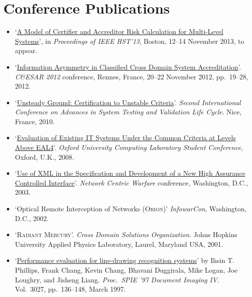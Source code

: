 \documentclass[12pt,letterpaper]{article}
\begin{document}
\vspace{-8mm}
\section*{Conference Publications}

\begin{itemize}
	\item `\href{http://ieee-hst.org/agenda/papers/papers_sched.html#cyber4}{A Model of
		Certifier and Accreditor Risk Calculation for Multi-Level Systems}', in
		\emph{Proceedings of IEEE HST'13}, Boston, 12--14 November 2013, to appear.

	\item `\href{http://applied-math.org/CESAR2012_information_asymmetry.pdf}{Information
		Asymmetry in Classified Cross Domain System Accreditation}'. \emph{C\&ESAR 2012}
		conference, Rennes, France, 20--22 November 2012, pp.\ 19--28, 2012.

	\item `\href{http://ieeexplore.ieee.org/xpls/abs_all.jsp?arnumber=5617171&tag=1}{Unsteady
		Ground: Certification to Unstable Criteria}'. \emph{Second International Conference
		on Advances in System Testing and Validation Life Cycle}. Nice, France, 2010. 

	\item `\href{http://www.cs.ox.ac.uk/files/1328/RR-08-10.pdf}{Evaluation of Existing IT
		Systems Under the Common Criteria at Levels Above EAL4}'. \emph{Oxford University
		Computing Laboratory Student Conference}, Oxford, U.K., 2008.

    \item `\href{https://docs.google.com/viewer?a=v&q=cache:OjDo4H9Pj10J:citeseerx.ist.psu.edu/viewdoc/download%3Fdoi%3D10.1.1.10.4531%26rep%3Drep1%26type%3Dpdf+&hl=en&gl=uk&pid=bl&srcid=ADGEESgzzne2bVzWsUDU4ITF7lKKcGhA_k51PqkEVB7aiZgGgJ65C9VGGFIDIL2TQ_YUcdDO20UNkw-mnwZN71u0JDy5EYltrpjR_If5ZU8yyXc400Izs9ywtAeLkxHyxd02fNek-mj4&sig=AHIEtbQHRLT1rO3Eft0-P1LmHBrZ7zJL7w}{Use
		of XML in the Specification and Development of a New High Assurance Controlled Interface}'.
		\emph{Network Centric Warfare} conference, Washington, D.C., 2003.

    \item `Optical Remote Interception of Networks (\textsc{Orion})'
		\emph{InfowarCon}, Washington, D.C., 2002.

    \item `\textsc{Radiant Mercury}'. \emph{Cross Domain Solutions
		Organization}. Johns Hopkins University Applied Physics Laboratory,
		Laurel, Maryland USA, 2001.

    \item `\href{http://proceedings.spiedigitallibrary.org/proceeding.aspx?articleid=920871}{Performance
		evaluation for line-drawing recognition systems}'
		by Ihsin T. Phillips, Frank Chang, Kevin Chang, Bhavani Duggirala,
		Mike Logan, Joe Loughry, and Jisheng Liang. \emph{Proc.\ SPIE '97
		Document Imaging IV}. Vol.\ 3027, pp.\ 136--148, March 1997.
\end{itemize}
\end{document}
